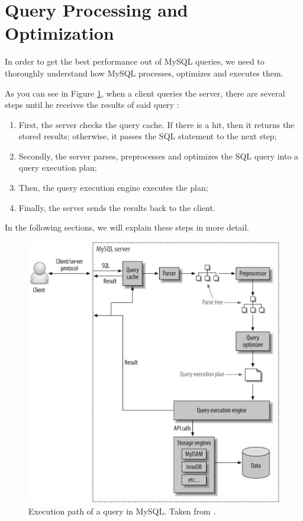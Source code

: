 \documentclass[12pt]{article}
\begin{document}
\newpage
\section{Query Processing and Optimization}
\label{queryProcessingOptimization}

In order to get the best performance out of MySQL queries, we need to thoroughly understand how MySQL processes, optimizes and executes them.

As you can see in Figure \ref{querie_execution}, when a client queries the server, there are several steps until he receives the results of said query \parencite{QueryOptimizationBook}:
\begin{enumerate}
    \item First, the server checks the query cache. If there is a hit, then it returns the stored results; otherwise, it passes the SQL statement to the next step;
    
    \item Secondly, the server parses, preprocesses and optimizes the SQL query into a query execution plan;

    \item Then, the query execution engine executes the plan;

    \item Finally, the server sends the results back to the client.
\end{enumerate}

\noindent In the following sections, we will explain these steps in more detail.
\vspace{0.3cm}
\begin{figure}[htbp]
\centering
    \includegraphics[scale=0.35]{files/mysql.png}
    \caption{Execution path of a query in MySQL. Taken from \parencite{QueryOptimizationBook}.}
    \label{querie_execution}
\end{figure}
\end{document}
